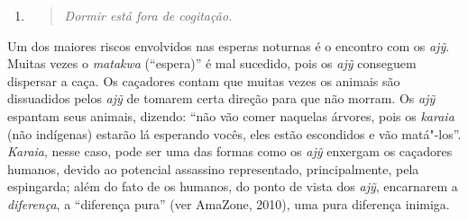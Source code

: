 \begin{enumerate}
\begin{quote}
  \emph{A lanterna --- ferramenta de grande valia na espera noturna --- permanece
    amarrada à rede para ser sacada na chegada do animal. Ela é acesa
    instantes antes do tiro, apenas para o caçador encontrar a posição da
    presa com precisão. O tempo de iluminar a presa é o mesmo em que o
    animal percebe que está sendo observado e foge. Os Guajá lembram que
    ao ``jogarem luz'' na presa, antes da fuga (principalmente a anta, o
    veado e a paca), ela mantém"-se paralisada por poucos milésimos,
    olhando a fonte de luz. É durante esse tempo que devem atirar}.
    \end{quote}
\item
\begin{quote}
  \emph{Dormir está fora de cogitação.}
  \end{quote}
\end{enumerate}

Um dos maiores riscos envolvidos nas esperas noturnas é o encontro com
os \emph{ajỹ}. Muitas vezes o \emph{matakwa} (``espera)'' é mal
sucedido, pois os \emph{ajỹ} conseguem dispersar a caça. Os caçadores
contam que muitas vezes os animais são dissuadidos pelos \emph{ajỹ} de
tomarem certa direção para que não morram. Os \emph{ajỹ} espantam seus
animais, dizendo: ``não vão comer naquelas árvores, pois os \emph{karaia}
(não indígenas) estarão lá esperando vocês, eles estão escondidos e vão
matá"-los''. \emph{Karaia}, nesse caso, pode ser uma das formas como os
\emph{ajỹ} enxergam os caçadores humanos, devido ao potencial assassino
representado, principalmente, pela espingarda; além do fato de os
humanos, do ponto de vista dos \emph{ajỹ}, encarnarem a
\emph{diferença}, a ``diferença pura'' (ver AmaZone, 2010), uma pura
diferença inimiga.

